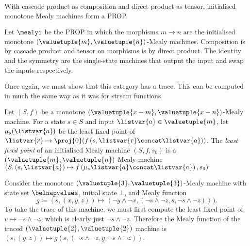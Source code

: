 With cascade product as composition and direct product as tensor, initialised
monotone Mealy machines form a PROP.

\begin{definition}
    Let \(\mealyi\) be the PROP in which the morphisms
    \(m \to n\) are the initialised monotone
    \((\valuetuple{m}, \valuetuple{n})\)-Mealy machines.
    Composition is by cascade product and tensor on morphisms is by
    direct product.
    The identity and the symmetry are the single-state machines that output the
    input and swap the inputs respectively.
\end{definition}

Once again, we must show that this category has a trace.
This can be computed in much the same way as it was for stream functions.

\begin{definition}
    Let \((S, f)\) be a monotone \(
    (\valuetuple{x+m}, \valuetuple{x+n})
    \)-Mealy machine.
    For a state \(s \in S\) and input \(\listvar{a} \in \valuetuple{m}\), let
    \(\mu_{s}(\listvar{a})\) be the least fixed point of \(
    \listvar{r} \mapsto \proj{0}\mleft(f\left(s, \listvar{r} \concat \listvar{a}\right)\mright)
    \).
    The \emph{least fixed point} of an initialised Mealy machine \((S, f, s_0)\)
    is a \((\valuetuple{m}, \valuetuple{n})\)-Mealy machine \(\left(
    S, (s, \listvar{a})
    \mapsto
    f\left(\mu_{s}\listvar{a} \concat \listvar{a}\right), s_0
    \right)
    \)
\end{definition}

\begin{example}\label{ex:trace-mealy}
    Consider the monotone \((\valuetuple{3},\valuetuple{3})\)-Mealy machine with
    state set \(\belnapvalues\), initial state \(\bot\), and Mealy function \[
        g \coloneqq (s, (x, y, z))
        \mapsto \left\langle \neg y \land \neg x,
        \left(\neg s \land \neg z, s, \neg s \land \neg z\right)
        \right\rangle
        ).\]
    To take the trace of this machine, we must first compute the least fixed
    point of \(v \mapsto \neg s \land \neg z\), which is clearly just
    \(\neg s \land \neg z\).
    Therefore the Mealy function of the traced
    \((\valuetuple{2}, \valuetuple{2})\) machine is \(
    (s, (y, z)) \mapsto g(s, (\neg s \land \neg z, y, \neg s \land \neg z))
    \).
\end{example}

